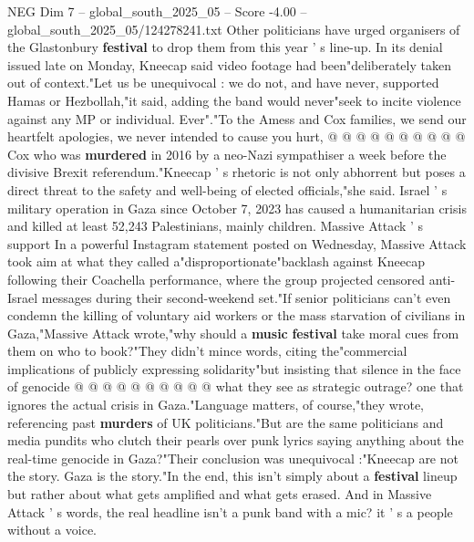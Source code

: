 \begin{textsample}{NEG Dim 7 – global\_south\_2025\_05 – Score -4.00 – global\_south\_2025\_05/124278241.txt}
Other politicians have urged organisers of the Glastonbury \textbf{festival} to drop them from this year ' s line-up.
In its denial issued late on Monday, Kneecap said video footage had been"deliberately taken out of context."Let us be unequivocal : we do not, and have never, supported Hamas or Hezbollah,"it said, adding the band would never"seek to incite violence against any MP or individual.
Ever"."To the Amess and Cox families, we send our heartfelt apologies, we never intended to cause you hurt, @ @ @ @ @ @ @ @ @ @ Cox who was \textbf{murdered} in 2016 by a neo-Nazi sympathiser a week before the divisive Brexit referendum."Kneecap ' s rhetoric is not only abhorrent but poses a direct threat to the safety and well-being of elected officials,"she said.
Israel ' s military operation in Gaza since October 7, 2023 has caused a humanitarian crisis and killed at least 52,243 Palestinians, mainly children.
Massive Attack ' s support In a powerful Instagram statement posted on Wednesday, Massive Attack took aim at what they called a"disproportionate"backlash against Kneecap following their Coachella performance, where the group projected censored anti-Israel messages during their second-weekend set."If senior politicians can't even condemn the killing of voluntary aid workers or the mass starvation of civilians in Gaza,"Massive Attack wrote,"why should a \textbf{music} \textbf{festival} take moral cues from them on who to book?"They didn't mince words, citing the"commercial implications of publicly expressing solidarity"but insisting that silence in the face of genocide @ @ @ @ @ @ @ @ @ @ what they see as strategic outrage? one that ignores the actual crisis in Gaza."Language matters, of course,"they wrote, referencing past \textbf{murders} of UK politicians."But are the same politicians and media pundits who clutch their pearls over punk lyrics saying anything about the real-time genocide in Gaza?"Their conclusion was unequivocal :"Kneecap are not the story.
Gaza is the story."In the end, this isn't simply about a \textbf{festival} lineup but rather about what gets amplified and what gets erased.
And in Massive Attack ' s words, the real headline isn't a punk band with a mic? it ' s a people without a voice.

\end{textsample}
